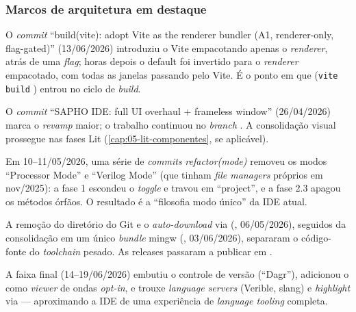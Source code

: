 \subsubsection{Marcos de arquitetura em destaque}

\begin{description}[style=nextline,leftmargin=0pt]
  \item[Adoção do Vite] O \emph{commit} \enquote{build(vite): adopt Vite as the
    renderer bundler (A1, renderer-only, flag-gated)} (13/06/2026) introduziu o
    Vite empacotando apenas o \emph{renderer}, atrás de uma \emph{flag}; horas
    depois o default foi invertido para o \emph{renderer} empacotado, com todas
    as janelas passando pelo Vite. É o ponto em que 
    (\lstinline|vite build| \textrightarrow{} ) entrou no ciclo de
    \emph{build}.
  \item[Revamp visual] O \emph{commit} \enquote{SAPHO IDE: full UI overhaul +
    frameless window} (26/04/2026) marca o \emph{revamp} maior; o trabalho
    continuou no \emph{branch} . A consolidação
    visual prossegue nas fases Lit (\autoref{cap:05-lit-componentes}, se
    aplicável).
  \item[Consolidação para modo único] Em 10--11/05/2026, uma série de
    \emph{commits} \emph{refactor(mode)} removeu os modos \enquote{Processor
    Mode} e \enquote{Verilog Mode} (que tinham \emph{file managers} próprios em
    nov/2025): a fase 1 escondeu o \emph{toggle} e travou em \enquote{project},
    e a fase 2.3 apagou os métodos órfãos. O resultado é a \enquote{filosofia
    modo único} da IDE atual.
  \item[Bundle de toolchain e split de repos] A remoção do diretório
     do Git e o \emph{auto-download} via 
    (, 06/05/2026), seguidos da consolidação em um único
    \emph{bundle} mingw (, 03/06/2026), separaram o código-fonte
    do \emph{toolchain} pesado. As releases passaram a publicar em .
  \item[Source Control, Surfer, Verible, tree-sitter] A faixa final (14--19/06/2026)
    embutiu o controle de versão (\enquote{Dagr}), adicionou o 
    como \emph{viewer} de ondas \emph{opt-in}, e trouxe \emph{language servers}
    (Verible, slang) e \emph{highlight} via  ---
    aproximando a IDE de uma experiência de \emph{language tooling} completa.
\end{description}


